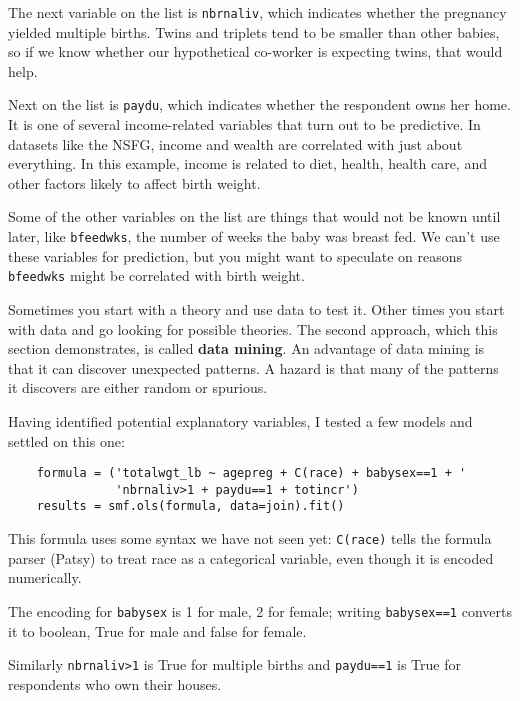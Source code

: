 The next variable on the list is {\tt nbrnaliv}, which indicates
whether the pregnancy yielded multiple births.  Twins and triplets
tend to be smaller than other babies, so if we know whether our
hypothetical co-worker is expecting twins, that would help.

Next on the list is {\tt paydu}, which indicates whether the
respondent owns her home.  It is one of several income-related
variables that turn out to be predictive.  In datasets like the NSFG,
income and wealth are correlated with just about everything.  In this
example, income is related to diet, health, health care, and other
factors likely to affect birth weight.

Some of the other variables on the list are things that would not
be known until later, like {\tt bfeedwks}, the number of weeks
the baby was breast fed.  We can't use these variables for prediction,
but you might want to speculate on reasons
{\tt bfeedwks} might be correlated with birth weight.

Sometimes you start with a theory and use data to test it.  Other
times you start with data and go looking for possible theories.
The second approach, which this section demonstrates, is
called {\bf data mining}.  An advantage of data mining is that it
can discover unexpected patterns.  A hazard is that many of the
patterns it discovers are either random or spurious.

Having identified potential explanatory variables, I tested a few
models and settled on this one:

\begin{verbatim}
    formula = ('totalwgt_lb ~ agepreg + C(race) + babysex==1 + '
               'nbrnaliv>1 + paydu==1 + totincr')
    results = smf.ols(formula, data=join).fit()
\end{verbatim}

This formula uses some syntax we have not seen yet:
{\tt C(race)} tells the formula parser (Patsy) to treat race as a
categorical variable, even though it is encoded numerically.

The encoding for {\tt babysex} is 1 for male, 2 for female; writing
{\tt babysex==1} converts it to boolean, True for male and false for
female.

Similarly {\tt nbrnaliv>1} is True for multiple births and 
{\tt paydu==1} is True for respondents who own their houses.

